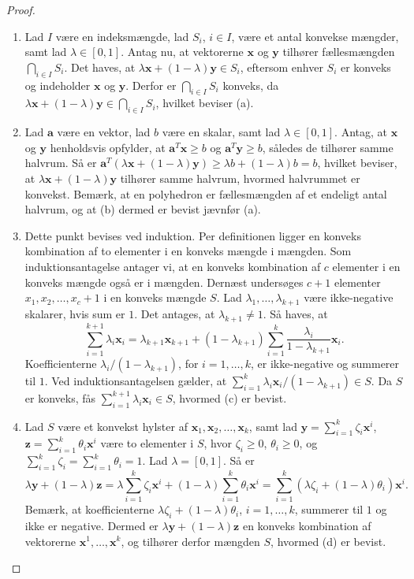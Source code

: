 %
%
\begin{proof}
\begin{enumerate}[label=(\alph*)]
	\item Lad $I$ være en indeksmængde, lad $S_i$, $i \in I$, være et antal konvekse mængder, samt lad $ \lambda \in [0,1]$.
Antag nu, at vektorerne $\textbf{x}$ og $\textbf{y}$ tilhører fællesmængden $ \bigcap_{i \in I} S_i$. 
Det haves, at $ \lambda \textbf{x} + (1 - \lambda )\textbf{y} \in S_i$, eftersom enhver $S_i$ er konveks og  indeholder $\textbf{x}$ og $\textbf{y}$. Derfor er $ \bigcap_{i \in I} S_i$ konveks, da $ \lambda \textbf{x} + (1 - \lambda )\textbf{y} \in  \bigcap_{i \in I} S_i$, hvilket beviser (a). 
	\item Lad $\textbf{a}$ være en vektor, lad $b$ være en skalar, samt lad $ \lambda \in [0,1]$. 
Antag, at $\textbf{x}$ og $\textbf{y}$ henholdsvis opfylder, at $\textbf{a}^T \textbf{x} \geq b$ og $\textbf{a}^T \textbf{y} \geq b$, således de tilhører samme halvrum. 
Så er $\textbf{a}^T (\lambda \textbf{x} + (1 - \lambda) \textbf{y} ) \geq \lambda b + (1 - \lambda ) b = b$, hvilket beviser, at $ \lambda \textbf{x} + (1 - \lambda )\textbf{y}$ tilhører samme halvrum, hvormed halvrummet er konvekst.
Bemærk, at en polyhedron er fællesmængden af et endeligt antal halvrum, og at (b) dermed er bevist jævnfør (a). 
	\item  Dette punkt bevises ved induktion.
Per definitionen ligger en konveks kombination af to elementer i en konveks mængde i mængden.
Som induktionsantagelse antager vi, at en konveks kombination af $c$ elementer i en konveks mængde også er i mængden.
Dernæst undersøges $c+1$ elementer $x_1,x_2,\ldots,x_c+1$ i en konveks mængde $S$. 
Lad $\lambda_1,\ldots,\lambda_{k+1}$ være ikke-negative skalarer, hvis sum er $1$. 
Det antages, at $\lambda_{k+1}\neq1$. 
Så haves, at
$$\sum^{k+1}_{i=1}\lambda_i\textbf{x}_i=\lambda_{k+1}\textbf{x}_{k+1}+(1-\lambda_{k+1})\sum^{k}_{i=1}\dfrac{\lambda_i}{1-\lambda_{k+1}}\textbf{x}_i.$$
Koefficienterne $\lambda_i/(1-\lambda_{k+1})$, for $i=1,\ldots,k$, er ikke-negative og summerer til $1$. 
Ved induktionsantagelsen gælder, at $\sum^{k}_{i=1}\lambda_i\textbf{x}_i/(1-\lambda_{k+1})\in S$. 
Da $S$ er konveks, fås 
$\sum^{k+1}_{i=1}\lambda_i\textbf{x}_i\in S$, hvormed (c) er bevist. 
	\item Lad $S$ være et konvekst hylster af $\textbf{x}_1, \textbf{x}_2, \ldots, \textbf{x}_k$, samt lad $\textbf{y} = \sum_{i=1}^{k} \zeta_i \textbf{x}^i$, $\textbf{z} = \sum_{i=1}^{k} \theta_i \textbf{x}^i$ være to elementer i $S$, hvor $ \zeta_i \geq 0$, $ \theta_i \geq 0$, og $ \sum_{i=1}^{k} \zeta_i = \sum_{i=1}^{k} \theta_i = 1$. 
	Lad $ \lambda = [0,1]$. Så er $$\lambda \textbf{y} + (1 - \lambda ) \textbf{z} = \lambda \sum_{i=1}^k \zeta_i \textbf{x}^i + (1 - \lambda) \sum_{i=1}^k \theta_i \textbf{x}^i = \sum_{i=1}^k (\lambda \zeta_i + (1-\lambda )\theta_i ) \textbf{x}^i.$$
Bemærk, at koefficienterne $ \lambda \zeta_i + (1 - \lambda) \theta_i$, $i = 1, \ldots, k$, summerer til $1$ og ikke er negative. Dermed er $ \lambda \textbf{y} + (1 - \lambda ) \textbf{z}$ en konveks kombination af vektorerne $\textbf{x}^1, \ldots, \textbf{x}^k$, og tilhører derfor mængden $S$, hvormed (d) er bevist. 
\end{enumerate}
\end{proof}